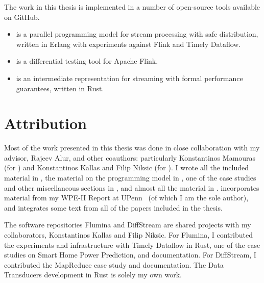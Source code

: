 The work in this thesis is implemented in a number of open-source tools available on GitHub.
\begin{samepage}
\begin{itemize}
\item {} is a parallel programming model for stream processing with safe distribution, written in Erlang with experiments against Flink and Timely Dataflow.
\item {} is a differential testing tool for Apache Flink.
\item {} is an intermediate representation for streaming with formal performance guarantees, written in Rust.
\end{itemize}
\end{samepage}

\section{Attribution}

Most of the work presented in this thesis was done in close collaboration with my advisor, Rajeev Alur, and other coauthors:
particularly Konstantinos Mamouras (for ) and Konstantinos Kallas and Filip Niksic (for ).
I wrote all the included material in , the material on the programming model in , one of the case studies and other miscellaneous sections in , and almost all the material in .
 incorporates material from my WPE-II Report at UPenn~ (of which I am the sole author), and  integrates some text from all of the papers included in the thesis.

The software repositories Flumina and DiffStream are shared projects with my collaborators, Konstantinos Kallas and Filip Niksic.
For Flumina, I contributed the experiments and infrastructure with Timely Dataflow in Rust, one of the case studies on Smart Home Power Prediction, and documentation.
For DiffStream, I contributed the MapReduce case study and documentation.
The Data Transducers development in Rust is solely my own work.
